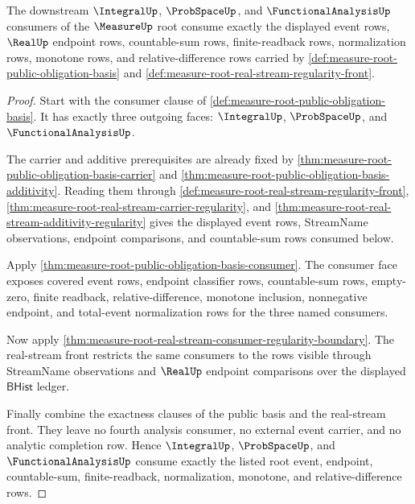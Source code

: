 \begin{theorem}
\label{thm:measure-root-probspace-integral-consumer-surface}
The downstream $\IntegralUp$, $\ProbSpaceUp$, and
$\FunctionalAnalysisUp$ consumers of the $\MeasureUp$ root consume exactly
the displayed event rows, $\RealUp$ endpoint rows, countable-sum rows,
finite-readback rows, normalization rows, monotone rows, and
relative-difference rows carried by
\autoref{def:measure-root-public-obligation-basis} and
\autoref{def:measure-root-real-stream-regularity-front}.
\end{theorem}
\begin{proof}
Start with the consumer clause of
\autoref{def:measure-root-public-obligation-basis}. It has exactly three
outgoing faces: $\IntegralUp$, $\ProbSpaceUp$, and
$\FunctionalAnalysisUp$.

The carrier and additive prerequisites are already fixed by
\autoref{thm:measure-root-public-obligation-basis-carrier} and
\autoref{thm:measure-root-public-obligation-basis-additivity}. Reading them
through \autoref{def:measure-root-real-stream-regularity-front},
\autoref{thm:measure-root-real-stream-carrier-regularity}, and
\autoref{thm:measure-root-real-stream-additivity-regularity} gives the
displayed event rows, StreamName observations, endpoint comparisons, and
countable-sum rows consumed below.

Apply \autoref{thm:measure-root-public-obligation-basis-consumer}. The
consumer face exposes covered event rows, endpoint classifier rows,
countable-sum rows, empty-zero, finite readback, relative-difference,
monotone inclusion, nonnegative endpoint, and total-event normalization rows
for the three named consumers.

Now apply
\autoref{thm:measure-root-real-stream-consumer-regularity-boundary}. The
real-stream front restricts the same consumers to the rows visible through
StreamName observations and $\RealUp$ endpoint comparisons over the displayed
$\mathsf{BHist}$ ledger.

Finally combine the exactness clauses of the public basis and the
real-stream front. They leave no fourth analysis consumer, no external
event carrier, and no analytic completion row. Hence $\IntegralUp$,
$\ProbSpaceUp$, and $\FunctionalAnalysisUp$ consume exactly the listed root
event, endpoint, countable-sum, finite-readback, normalization, monotone, and
relative-difference rows.
\end{proof}

